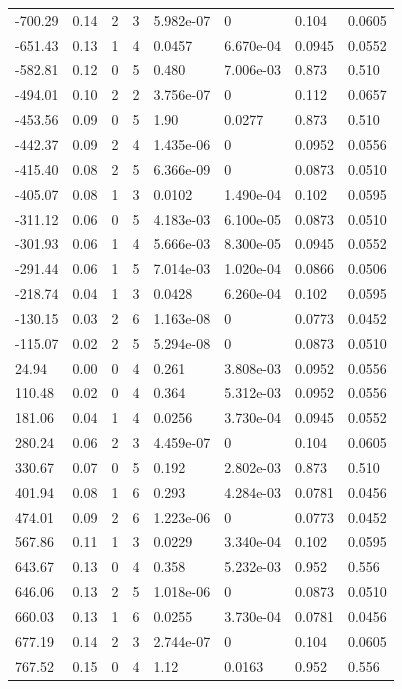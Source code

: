 \documentclass[preview]{standalone}
\begin{document}
{{\begin{tabular}{L{1.2cm}C{1.2cm} C{0.3cm}C{0.5cm} C{1.4cm}C{1.4cm} C{1.4cm}C{1.4cm}}
  -700.29  &  0.14  & 2     &  3 &  5.982e-07  & 0  & 0.104 &  0.0605   \\ 
  -651.43  &  0.13  & 1     &  4 &  0.0457  & 6.670e-04  & 0.0945 &  0.0552   \\ 
  -582.81  &  0.12  & 0     &  5 &  0.480  & 7.006e-03  & 0.873 &  0.510   \\ 
  -494.01  &  0.10  & 2     &  2 &  3.756e-07  & 0  & 0.112 &  0.0657   \\ 
  -453.56  &  0.09  & 0     &  5 &  1.90  & 0.0277  & 0.873 &  0.510   \\ 
  -442.37  &  0.09  & 2     &  4 &  1.435e-06  & 0  & 0.0952 &  0.0556   \\ 
  -415.40  &  0.08  & 2     &  5 &  6.366e-09  & 0  & 0.0873 &  0.0510   \\ 
  -405.07  &  0.08  & 1     &  3 &  0.0102  & 1.490e-04  & 0.102 &  0.0595   \\ 
  -311.12  &  0.06  & 0     &  5 &  4.183e-03  & 6.100e-05  & 0.0873 &  0.0510   \\ 
  -301.93  &  0.06  & 1     &  4 &  5.666e-03  & 8.300e-05  & 0.0945 &  0.0552   \\ 
  -291.44  &  0.06  & 1     &  5 &  7.014e-03  & 1.020e-04  & 0.0866 &  0.0506   \\ 
  -218.74  &  0.04  & 1     &  3 &  0.0428  & 6.260e-04  & 0.102 &  0.0595   \\ 
  -130.15  &  0.03  & 2     &  6 &  1.163e-08  & 0  & 0.0773 &  0.0452   \\ 
  -115.07  &  0.02  & 2     &  5 &  5.294e-08  & 0  & 0.0873 &  0.0510   \\ 
  24.94  &  0.00  & 0     &  4 &  0.261  & 3.808e-03  & 0.0952 &  0.0556   \\ 
  110.48  &  0.02  & 0     &  4 &  0.364  & 5.312e-03  & 0.0952 &  0.0556   \\ 
  181.06  &  0.04  & 1     &  4 &  0.0256  & 3.730e-04  & 0.0945 &  0.0552   \\ 
  280.24  &  0.06  & 2     &  3 &  4.459e-07  & 0  & 0.104 &  0.0605   \\ 
  330.67  &  0.07  & 0     &  5 &  0.192  & 2.802e-03  & 0.873 &  0.510   \\ 
  401.94  &  0.08  & 1     &  6 &  0.293  & 4.284e-03  & 0.0781 &  0.0456   \\ 
  474.01  &  0.09  & 2     &  6 &  1.223e-06  & 0  & 0.0773 &  0.0452   \\ 
  567.86  &  0.11  & 1     &  3 &  0.0229  & 3.340e-04  & 0.102 &  0.0595   \\ 
  643.67  &  0.13  & 0     &  4 &  0.358  & 5.232e-03  & 0.952 &  0.556   \\ 
  646.06  &  0.13  & 2     &  5 &  1.018e-06  & 0  & 0.0873 &  0.0510   \\ 
  660.03  &  0.13  & 1     &  6 &  0.0255  & 3.730e-04  & 0.0781 &  0.0456   \\ 
  677.19  &  0.14  & 2     &  3 &  2.744e-07  & 0  & 0.104 &  0.0605   \\ 
  767.52  &  0.15  & 0     &  4 &  1.12  & 0.0163  & 0.952 &  0.556   \\ 
\hline 
\end{tabular} 

}}
\end{document}
